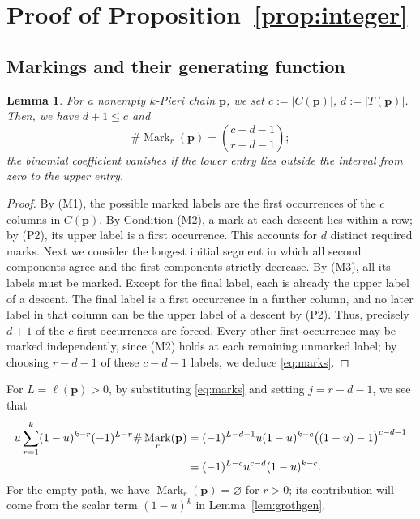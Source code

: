 \documentclass[11pt,a4paper,reqno]{amsart}
\DeclareRobustCommand{\rev}[1]{{\color{revision}#1}}
\numberwithin{equation}{section}
\newtheorem{lemma}[theorem]{Lemma}
\theoremstyle{definition}
\DeclareMathOperator{\Mark}{Mark}
\newcommand{\pp}{\mathbf p}
\begin{document}
\section{Proof of Proposition~\ref{prop:integer}}\label{sec:marks}
\subsection{Markings and their generating function}
\begin{lemma}\label{lem:marks}
For a nonempty \(k\)-Pieri chain \(\pp\), we set \(c:=|C(\pp)|\), \(d:=|T(\pp)|\). Then, we have \(d+1\le c\) and
\begin{equation}\label{eq:marks}
 \#\Mark_r(\pp)=\binom{c-d-1}{r-d-1};
\end{equation}
the binomial coefficient vanishes if the lower entry lies outside the interval from zero to the upper entry.
\end{lemma}
\begin{proof}
\rev{By (M1), the possible marked labels are the first occurrences of the \(c\) columns in \(C(\pp)\). By Condition (M2), a mark at each descent lies within a row; by (P2), its upper label is a first occurrence. This accounts for \(d\) distinct required marks. Next we consider the longest initial segment in which all second components agree and the first components strictly decrease. By (M3), all its labels must be marked. Except for the final label, each is already the upper label of a descent. The final label is a first occurrence in a further column, and no later label in that column can be the upper label of a descent by (P2). Thus, precisely \(d+1\) of the \(c\) first occurrences are forced. Every other first occurrence may be marked independently, since (M2) holds at each remaining unmarked label; by choosing \(r-d-1\) of these \(c-d-1\) labels, we deduce \eqref{eq:marks}.}
\end{proof}

For \(L=\ell(\pp)>0\), by substituting \eqref{eq:marks} and setting \(j=r-d-1\), we see that 
\begin{align}
 u\sum_{r=1}^k(1-u)^{k-r}(-1)^{L-r}\#\Mark_r(\pp)
 &=
 (-1)^{L-d-1}u(1-u)^{k-c}\big((1-u)-1\big)^{c-d-1}\notag\\
 &=(-1)^{L-c}u^{c-d}(1-u)^{k-c}.
 \label{eq:markgen}
\end{align}
\rev{For the empty path, we have \(\Mark_r(\pp)=\varnothing\) for \(r>0\); its contribution will come from the scalar term \((1-u)^k\) in Lemma~\ref{lem:grothgen}.}
\end{document}
